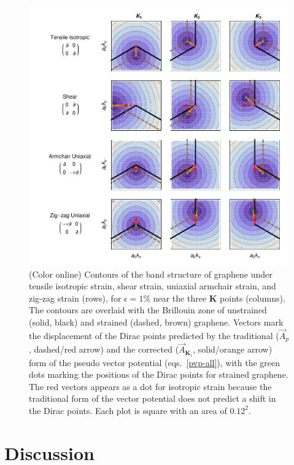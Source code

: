 \begin{figure}
\includegraphics{Figs_PVP/figure_2.pdf}
\caption{(Color online) Contours of the band structure of graphene under tensile isotropic strain, shear strain, uniaxial armchair strain, and zig-zag strain (rows), for $\epsilon=1\%$ near the three $\bm{K}$ points (columns). The contours are overlaid with the Brillouin zone of unstrained (solid, black)  and strained (dashed, brown) graphene. Vectors mark the displacement of the Dirac points predicted by the traditional ($\vec{A}_p$, dashed/red arrow) and the corrected ($\vec{A}_{\bm{K}_{\!i}}$, solid/orange arrow) form of the pseudo vector potential (eqs.~\ref{pvp-all}), with the green dots marking the positions of the Dirac points for strained graphene. The red vectors appears as a dot for isotropic strain because the traditional form of the vector potential does not predict a shift in the Dirac points.  Each plot is square with an area of $0.12^2$. \label{fig:PVP:PVPshifts}}
\end{figure}


\section{Discussion}

